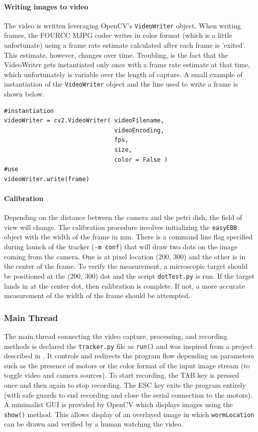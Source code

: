 \documentclass[main.tex]{subfiles}
\begin{document}
\paragraph{Writing images to video}
The video is written leveraging OpenCV's \verb|VideoWriter| object. When writing frames, the  FOURCC MJPG codec writes in color format (which is a little unfortunate) using a frame rate estimate calculated after each frame is 'exited'. This estimate, however, changes over time. Troubling, is the fact that the VideoWriter gets instantiated only once with a frame rate estimate at that time, which unfortunately is variable over the length of capture. A small example of instantiation of the \verb|VideoWriter| object and the line used to write a frame is shown below. \\

\begin{lstlisting}
#instantiation
videoWriter = cv2.VideoWriter( videoFilename, 
                               videoEncoding, 
                               fps, 
                               size, 
                               color = False )
#use
videoWriter.write(frame)
\end{lstlisting}

\paragraph{Calibration}
Depending on the distance between the camera and the petri dish, the field of view will change. The calibration procedure involves initializing the \verb|easyEBB| object with the width of the frame in mm. There is a command line flag specified during launch of the tracker (\verb|-m conf|) that will draw two dots on the image coming from the camera. One is at pixel location (200, 300) and the other is in the center of the frame. To verify the measurement, a microscopic target should be positioned at the (200, 300) dot and the script \verb|dotTest.py| is run. If the target lands in at the center dot, then calibration is complete. If not, a more accurate measurement of the width of the frame should be attempted. 


\subsubsection{Main Thread}
The main thread connecting the video capture, processing, and recording methods is declared the \verb|tracker.py| file as \verb|run()| and was inspired from a project described in \cite{OpenCVPython}. It controls and redirects the program flow depending on parameters such as the presence of motors or the color format of the input image stream (to toggle video and camera sources). To start recording, the TAB key is pressed once and then again to stop recording. The ESC key exits the program entirely (with safe guards to end recording and close the serial connection to the motors). A minimalist GUI is provided by OpenCV which displays images using the \verb|show()| method. This allows display of an overlayed image in which \verb|wormLocation| can be drawn and verified by a human watching the video. 
\end{document}
